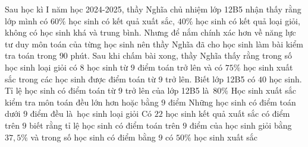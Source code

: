 \begin{ex}%
	Sau học kì I năm học 2024-2025, thầy Nghĩa chủ nhiệm lớp 12B5 nhận thấy rằng lớp mình có $60\%$ học sinh có kết quả xuất sắc, $40\%$ học sinh có kết quả loại giỏi,  không có học sinh khá và trung bình. Nhưng để nắm chính xác hơn về năng lực tư duy môn toán của từng học sinh nên thầy Nghĩa đã cho học sinh làm bài kiểm tra toán trong $90$ phút. Sau khi chấm bài xong, thầy Nghĩa thấy rằng trong số học sinh loại giỏi có $8$ học sinh từ $9$ điểm toán trở lên và có $75\%$ học sinh xuất sắc trong các học sinh được điểm toán từ $9$ trở lên. Biết lớp 12B5 có $40$ học sinh.
	\choiceTF 
		{\True Tỉ lệ học sinh có điểm toán từ $9$ trở lên  của lớp 12B5 là~$80\%$}
		{\True Học sinh xuất sắc kiểm tra môn toán  đều lớn hơn hoặc bằng $9$ điểm}
		{\True Những học sinh có điểm toán dưới $9$ điểm đều  là~học sinh loại giỏi}
		{\True Có $22$ học sinh kết quả xuất sắc có điểm trên $9$ biết rằng tỉ lệ học sinh có điểm toán trên $9$ điểm của học sinh giỏi bằng $37,5\%$ và trong số học sinh có điểm  bằng $9$ có $50\%$ học sinh xuất sắc}
\end{ex}
